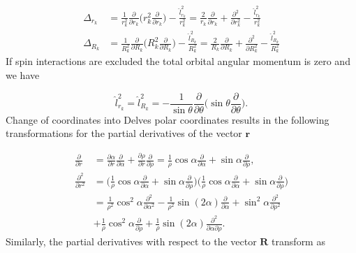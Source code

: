 \documentclass{article}
\numberwithin{equation}{section}
\begin{document}
\begin{subequations}
\begin{align}
	\Delta_{r_{k}} &= \frac{1}{r_{k}^2}\frac{\partial}{\partial r_{k}} \bigg( r_{k}^2 \frac{\partial}{\partial r_{k}} \bigg) - \frac{\hat{l}^2_{r_k}}{r_{k}^2} = \frac{2}{r_{k}}\frac{\partial}{\partial r_{k}} + \frac{\partial^2}{\partial r_{k}^{2}} - \frac{\hat{l}^{2}_{r_k}}{r_{k}^2}\\
	\Delta_{R_{k}} &= \frac{1}{R_{k}^2}\frac{\partial}{\partial R_{k}} \bigg( R_{k}^2 \frac{\partial}{\partial R_{k}} \bigg) - \frac{\hat{l}^2_{R_k}}{R_{k}^2} = \frac{2}{R_{k}}\frac{\partial}{\partial R_{k}} + \frac{\partial^2}{\partial R_{k}^{2}} - \frac{\hat{l}^{2}_{R_k}}{R_{k}^2}
\end{align}
\end{subequations}
If spin interactions are excluded the total orbital angular momentum is zero and we have 

\begin{equation}
\hat{l}^{2}_{r_k} = \hat{l}^{2}_{R_k} = -\frac{1}{\sin{\theta}} \frac{\partial}{\partial{\theta}} \bigg( \sin{\theta} \frac{\partial}{\partial{\theta}} \bigg).
\end{equation}
Change of coordinates into Delves polar coordinates results in the following transformations for the partial derivatives of the vector $\mathbf{r}$

\begin{subequations}
\begin{align}
        \frac{\partial}{\partial r}        &= \frac{\partial\alpha}{\partial r} \frac{\partial}{\partial\alpha} +  \frac{\partial\rho}{\partial r} \frac{\partial}{\partial\rho} = \frac{1}{\rho}\cos{\alpha}\frac{\partial}{\partial \alpha} + \sin{\alpha}\frac{\partial}{\partial \rho}, \\
        \frac{\partial^2}{\partial r^2} &= \bigg( \frac{1}{\rho} \cos\alpha \frac{\partial}{\partial\alpha} + \sin\alpha \frac{\partial}{\partial\rho}\bigg) \bigg( \frac{1}{\rho} \cos\alpha \frac{\partial}{\partial\alpha} + \sin\alpha \frac{\partial}{\partial\rho}\bigg) \nonumber \\
                                                     &= \frac{1}{\rho^2} \cos^2\alpha \frac{\partial^2}{\partial\alpha^{2}} - \frac{1}{\rho^2} \sin(2\alpha) \frac{\partial}{\partial\alpha} + \sin^2\alpha \frac{\partial^2}{\partial\rho^{2}} \nonumber \\
                                                     &+ \frac{1}{\rho} \cos^2\alpha \frac{\partial}{\partial\rho} + \frac{1}{\rho} \sin(2\alpha) \frac{\partial^2}{\partial\alpha \partial\rho}.
\end{align}
\end{subequations}
Similarly, the partial derivatives with respect to the vector $\mathbf{R}$ transform as
\end{document}
